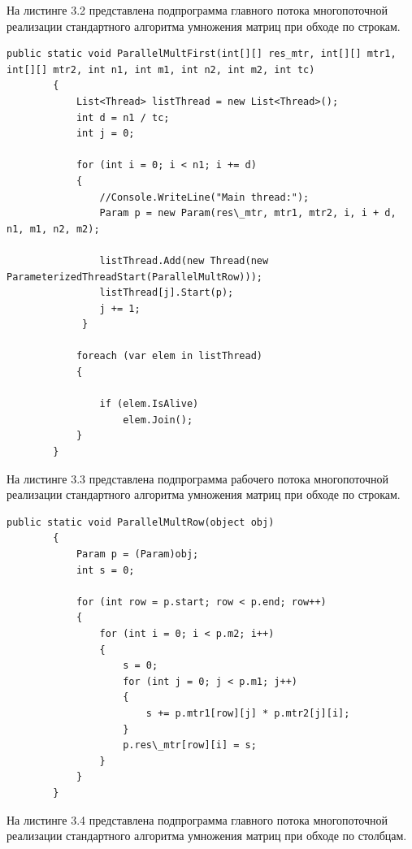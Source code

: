 \documentclass[12pt]{report}
\begin{document}
На листинге 3.2 представлена подпрограмма главного потока многопоточной реализации стандартного алгоритма умножения матриц при обходе по строкам.

\begin{lstlisting}[label=some-code,caption=Подпрограмма главного потока многопоточной реализации стандартного алгоритма умножения матриц (обход по строкам)]
public static void ParallelMultFirst(int[][] res_mtr, int[][] mtr1, int[][] mtr2, int n1, int m1, int n2, int m2, int tc)
        {
            List<Thread> listThread = new List<Thread>();
            int d = n1 / tc;
            int j = 0;
            
            for (int i = 0; i < n1; i += d)
            {
                //Console.WriteLine("Main thread:");
                Param p = new Param(res\_mtr, mtr1, mtr2, i, i + d, n1, m1, n2, m2);
                 
                listThread.Add(new Thread(new ParameterizedThreadStart(ParallelMultRow)));
                listThread[j].Start(p); 
                j += 1;
             }
     
            foreach (var elem in listThread)
            {

                if (elem.IsAlive)
                    elem.Join();
            }
        }
\end{lstlisting}

На листинге 3.3 представлена подпрограмма рабочего потока многопоточной реализации стандартного алгоритма умножения матриц при обходе по строкам.

\begin{lstlisting}[label=some-code,caption=Подпрограмма рабочего потока многопоточной реализации стандартного алгоритма умножения матриц (обход по строкам)]
public static void ParallelMultRow(object obj)
        {
            Param p = (Param)obj;
            int s = 0;

            for (int row = p.start; row < p.end; row++)
            {
                for (int i = 0; i < p.m2; i++)
                {
                    s = 0;
                    for (int j = 0; j < p.m1; j++)
                    {
                        s += p.mtr1[row][j] * p.mtr2[j][i];
                    }
                    p.res\_mtr[row][i] = s;
                }
            }
        }
\end{lstlisting}

На листинге 3.4 представлена подпрограмма главного потока многопоточной реализации стандартного алгоритма умножения матриц при обходе по столбцам.
\end{document}
